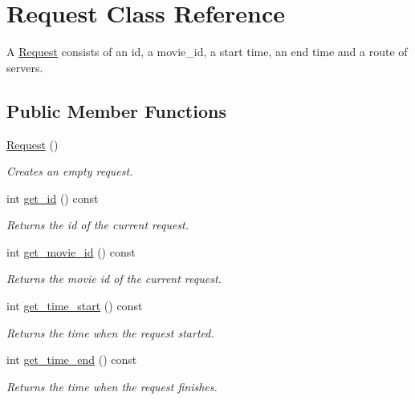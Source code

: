 \hypertarget{class_request}{
\section{Request Class Reference}
\label{class_request}
}


A \hyperlink{class_request}{Request} consists of an id, a movie\_\-id, a start time, an end time and a route of servers.  


\subsection*{Public Member Functions}
\begin{DoxyCompactItemize}
\item 
\hyperlink{class_request_afaf8d8928de7ffff8a3767589489bd33}{Request} ()
\begin{DoxyCompactList}\small\item\em Creates an empty request. \item\end{DoxyCompactList}\item 
int \hyperlink{class_request_a599ad8f23ad88cc996e3ed9b4f30d9dd}{get\_\-id} () const 
\begin{DoxyCompactList}\small\item\em Returns the id of the current request. \item\end{DoxyCompactList}\item 
int \hyperlink{class_request_aa3bd5944619ff25280f9415527cbba49}{get\_\-movie\_\-id} () const 
\begin{DoxyCompactList}\small\item\em Returns the movie id of the current request. \item\end{DoxyCompactList}\item 
int \hyperlink{class_request_ae4fd464df15930c0eefaf58532bc798c}{get\_\-time\_\-start} () const 
\begin{DoxyCompactList}\small\item\em Returns the time when the request started. \item\end{DoxyCompactList}\item 
int \hyperlink{class_request_a227ed7fcfb0cb2be9f1867da75c1bca2}{get\_\-time\_\-end} () const 
\begin{DoxyCompactList}\small\item\em Returns the time when the request finishes. \item\end{DoxyCompactList}\item 

\end{DoxyCompactItemize}
